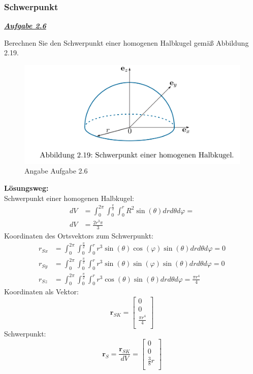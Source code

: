 \documentclass[a4paper,12p]{article}
\begin{document}
\subsubsection{Schwerpunkt}
\begin{flushleft}
	\underline{\textbf{\textit{Aufgabe 2.6}}} \\
\end{flushleft}
Berechnen Sie den Schwerpunkt einer homogenen Halbkugel gemäß Abbildung 2.19. 
\begin{figure}[h]
	\begin{center}
		\includegraphics[width=12.5cm]{pic/Angabe2_6}
		\caption{Angabe Aufgabe 2.6}
		\label{Aufgabe2.6}
	\end{center}
\end{figure} 
\newline
\textbf{Lösungsweg:} \\
Schwerpunkt einer homogenen Halbkugel: \\
\begin{align*}
	dV &= \int_{0}^{2\pi}\int_{0}^{\frac{\pi}{2}}\int_{0}^{r}R^2\sin(\theta)dr d\theta d\varphi = \\
	dV &= \frac{2r^3\pi}{3}
\end{align*}
\newpage
Koordinaten des Ortsvektors zum Schwerpunkt:
\begin{align*}
	r_{Sx} &= \int_{0}^{2\pi}\int_{0}^{\frac{\pi}{2}}\int_{0}^{r}r^3\sin(\theta)\cos(\varphi)\sin(\theta)dr d\theta d\varphi = 0 \\
	r_{Sy} &= \int_{0}^{2\pi}\int_{0}^{\frac{\pi}{2}}\int_{0}^{r}r^3\sin(\theta)\sin(\varphi)\sin(\theta)dr d\theta d\varphi = 0 \\
	r_{Sz} &= \int_{0}^{2\pi}\int_{0}^{\frac{\pi}{2}}\int_{0}^{r}r^3\cos(\theta)\sin(\theta)dr d\theta d\varphi = \frac{\pi r^4}{4}
\end{align*}
Koordinaten als Vektor:
\[
	\textbf{r}_{SK} = 
	\left[
		\begin{array}{c}
			0 \\
			0 \\
		    \frac{\pi r^4}{4} \\
		\end{array}
	\right]
\]
Schwerpunkt:
\[
	\textbf{r}_{S} = \frac{\textbf{r}_{SK}}{dV} = 
	\left[
		\begin{array}{c}
			0 \\
			0 \\
			\frac{3}{8}r \\
		\end{array}
	\right]
\]
\end{document}
